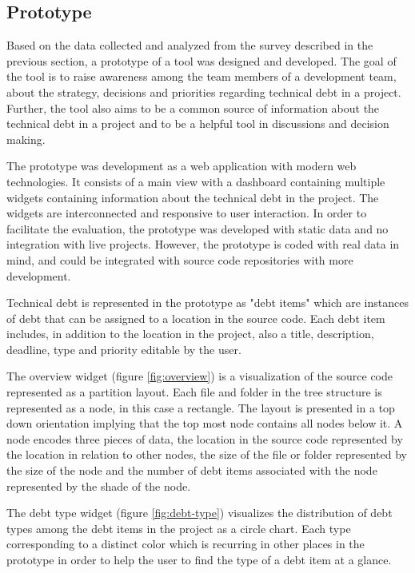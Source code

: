 \subsection{Prototype}

Based on the data collected and analyzed from the survey described in the previous section, a prototype of a tool was designed and developed.
The goal of the tool is to raise awareness among the team members of a development team, about the strategy, decisions and priorities regarding technical debt in a project.
Further, the tool also aims to be a common source of information about the technical debt in a project and to be a helpful tool in discussions and decision making.

The prototype was development as a web application with modern web technologies.
It consists of a main view with a dashboard containing multiple widgets containing information about the technical debt in the project.
The widgets are interconnected and responsive to user interaction.
In order to facilitate the evaluation, the prototype was developed with static data and no integration with live projects.
However, the prototype is coded with real data in mind, and could be integrated with source code repositories with more development.

Technical debt is represented in the prototype as "debt items" which are instances of debt that can be assigned to a location in the source code. Each debt item includes, in addition to the location in the project, also a title, description, deadline, type and priority editable by the user.



The overview widget (figure \ref{fig:overview}) is a visualization of the source code represented as a partition layout.
Each file and folder in the tree structure is represented as a node, in this case a rectangle.
The layout is presented in a top down orientation implying that the top most node contains all nodes below it.
A node encodes three pieces of data, the location in the source code represented by the location in relation to other nodes, the size of the file or folder represented by the size of the node and the number of debt items associated with the node represented by the shade of the node.



The debt type widget (figure \ref{fig:debt-type}) visualizes the distribution of debt types among the debt items in the project as a circle chart.
Each type corresponding to a distinct color which is recurring in other places in the prototype in order to help the user to find the type of a debt item at a glance.

